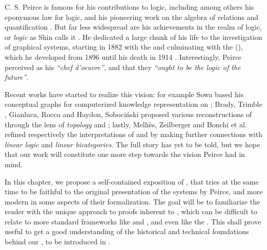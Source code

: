 \begin{scope}


C. S. Peirce is famous for his contributions to  logic, including
among others his eponymous law for  logic, and his pioneering work
on the algebra of relations and quantification \cite{peirce_algebra_1885}. But
far less widespread are his achievements in the realm of 
logic, or \emph{ logic} as Shin calls it
\cite{10.7551/mitpress/3633.001.0001}. He dedicated a large chunk of his life to
the investigation of graphical systems, starting in 1882 with the
\emph{} and culminating with the \emph{} (), which he developed from 1896 until his death in 1914
. Interestingly, Peirce perceived 
as his \textit{``chef d'oeuvre''}, and that they \textit{``ought to be the logic
of the future''}.

Recent works have started to realize this vision: for example Sowa based his
conceptual graphs for computerized knowledge representation on 
; Brady, Trimble
, Gianluca, Rocco
 and Haydon, Sobociński
 proposed various reconstructions of
 through the lens of \emph{topology} and \emph{}; lastly,
Melliès, Zeilberger  and Bonchi et al.
 refined respectively the interpretations of
\cite{brady_string_nodate} and \cite{pietarinen_compositional_2020} by making
further connections with \emph{linear logic}  and
\emph{linear bicategories}. The full story has yet to be told, but we hope that
our work will constitute one more step towards the vision Peirce had in mind.

In this chapter, we propose a self-contained exposition of , that tries
at the same time to be faithful to the original presentation of the systems by
Peirce, and more modern in some aspects of their formalization. The goal will be
to familiarize the reader with the unique approach to proofs inherent to
, which can be difficult to relate to more standard frameworks like
 and  , and even   like the . This shall prove useful to get a good understanding of the
historical and technical foundations behind our \emph{}, to
be introduced in .


\end{scope}
